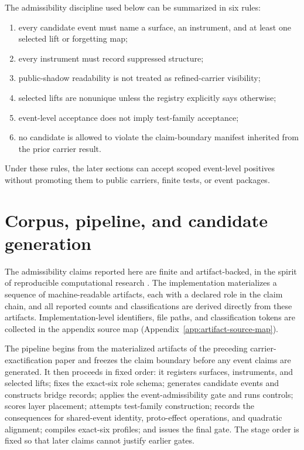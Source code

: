 \documentclass[11pt]{article}
\theoremstyle{definition}
\begin{document}
The admissibility discipline used below can be summarized in six rules:
\begin{enumerate}[label=(\roman*),leftmargin=*,itemsep=1pt,topsep=2pt]
\item every candidate event must name a surface, an instrument, and at least one selected lift or forgetting map;
\item every instrument must record suppressed structure;
\item public-shadow readability is not treated as refined-carrier visibility;
\item selected lifts are nonunique unless the registry explicitly says otherwise;
\item event-level acceptance does not imply test-family acceptance;
\item no candidate is allowed to violate the claim-boundary manifest inherited from the prior carrier result.
\end{enumerate}
Under these rules, the later sections can accept scoped event-level positives without promoting them to public carriers, finite tests, or event packages.
 \section{Corpus, pipeline, and candidate generation}
\label{sec:pipeline}

The admissibility claims reported here are finite and artifact-backed, in the spirit of reproducible computational research \citep{Donoho2010}. The implementation materializes a sequence of machine-readable artifacts, each with a declared role in the claim chain, and all reported counts and classifications are derived directly from these artifacts. Implementation-level identifiers, file paths, and classification tokens are collected in the appendix source map (Appendix~\ref{app:artifact-source-map}).

The pipeline begins from the materialized artifacts of the preceding carrier-exactification paper \citep{Tsiokos2026CarrierExactification} and freezes the claim boundary before any event claims are generated. It then proceeds in fixed order: it registers surfaces, instruments, and selected lifts; fixes the exact-six role schema; generates candidate events and constructs bridge records; applies the event-admissibility gate and runs controls; scores layer placement; attempts test-family construction; records the consequences for shared-event identity, proto-effect operations, and quadratic alignment; compiles exact-six profiles; and issues the final gate. The stage order is fixed so that later claims cannot justify earlier gates.
\end{document}

